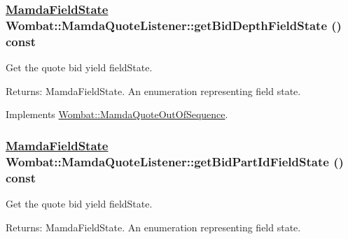 \hypertarget{classWombat_1_1MamdaQuoteListener_98c0e8e6190f6cb27684fd9abcf4a356}{
\subsubsection[getBidDepthFieldState]{\setlength{\rightskip}{0pt plus 5cm}\hyperlink{namespaceWombat_93aac974f2ab713554fd12a1fa3b7d2a}{Mamda\-Field\-State} Wombat::Mamda\-Quote\-Listener::get\-Bid\-Depth\-Field\-State () const}}
\label{classWombat_1_1MamdaQuoteListener_98c0e8e6190f6cb27684fd9abcf4a356}


Get the quote bid yield field\-State. 

\begin{Desc}
\item[Returns:]Mamda\-Field\-State. An enumeration representing field state. \end{Desc}


Implements \hyperlink{classWombat_1_1MamdaQuoteOutOfSequence_9755be1e5c5d476b19ec99e71d1bd3ea}{Wombat::Mamda\-Quote\-Out\-Of\-Sequence}.\hypertarget{classWombat_1_1MamdaQuoteListener_01e681d0b51718516807df702714f7ba}{
\subsubsection[getBidPartIdFieldState]{\setlength{\rightskip}{0pt plus 5cm}\hyperlink{namespaceWombat_93aac974f2ab713554fd12a1fa3b7d2a}{Mamda\-Field\-State} Wombat::Mamda\-Quote\-Listener::get\-Bid\-Part\-Id\-Field\-State () const}}
\label{classWombat_1_1MamdaQuoteListener_01e681d0b51718516807df702714f7ba}


Get the quote bid yield field\-State. 

\begin{Desc}
\item[Returns:]Mamda\-Field\-State. An enumeration representing field state. \end{Desc}


